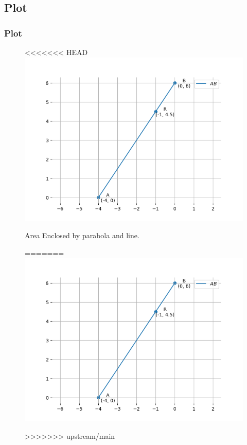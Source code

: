 \documentclass{beamer}
\theoremstyle{remark}
\numberwithin{equation}{section}
\begin{document}
\subsection{Plot}
\begin{frame}[fragile]
\frametitle{Plot}

\begin{figure}[h!]
   \centering
<<<<<<< HEAD
   \includegraphics[width=0.9\linewidth]{figs/fig1.png}
	\caption{Area Enclosed by parabola and line. }
=======
   \includegraphics[width=0.7\columnwidth]{figs/fig1.png}
	\caption{}
>>>>>>> upstream/main
   \label{stemplot}
\end{figure}
\end{frame}
\end{document}

